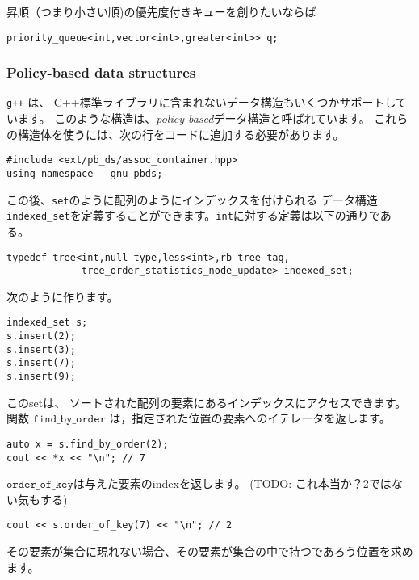 昇順（つまり小さい順)の優先度付きキューを創りたいならば


\begin{lstlisting}
priority_queue<int,vector<int>,greater<int>> q;
\end{lstlisting}

\subsubsection{Policy-based data structures}

\texttt{g++} は、
C++標準ライブラリに含まれないデータ構造もいくつかサポートしています。
このような構造は、\emph{policy-based}データ構造と呼ばれています。
これらの構造体を使うには、次の行をコードに追加する必要があります。

\begin{lstlisting}
#include <ext/pb_ds/assoc_container.hpp>
using namespace __gnu_pbds; 
\end{lstlisting}

この後、\texttt{set}のように配列のようにインデックスを付けられる
データ構造\texttt{indexed\_set}を定義することができます。\texttt{int}に対する定義は以下の通りである。

\begin{lstlisting}
typedef tree<int,null_type,less<int>,rb_tree_tag,
             tree_order_statistics_node_update> indexed_set; 
\end{lstlisting}

次のように作ります。

\begin{lstlisting}
indexed_set s;
s.insert(2);
s.insert(3);
s.insert(7);
s.insert(9);
\end{lstlisting}

このsetは、
ソートされた配列の要素にあるインデックスにアクセスできます。
関数 $\texttt{find\_by\_order}$ は，指定された位置の要素へのイテレータを返します。

\begin{lstlisting}
auto x = s.find_by_order(2);
cout << *x << "\n"; // 7
\end{lstlisting}

$\texttt{order\_of\_key}$は与えた要素のindexを返します。
(TODO: これ本当か？2ではない気もする)

\begin{lstlisting}
cout << s.order_of_key(7) << "\n"; // 2
\end{lstlisting}

その要素が集合に現れない場合、その要素が集合の中で持つであろう位置を求めます。

